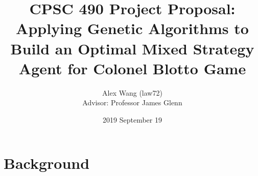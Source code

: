 \documentclass[11pt,letter]{article}
\begin{document}


\title{CPSC 490 Project Proposal: \\
       Applying Genetic Algorithms to Build an Optimal Mixed Strategy Agent for Colonel Blotto Game}

\author{Alex Wang (law72)\\
   		Advisor: Professor James Glenn}

\date{2019 September 19}
 
\maketitle 
\newtheorem{lemma}[theorem]{Lemma}
\newtheorem{prop}{Proposition}

\newcommand{\R}{\mathbb{R}}
\newcommand{\Z}{\mathbb{Z}}
\newcommand{\N}{\mathbb{N}}
\newcommand{\C}{\mathbb{C}}
\newcommand{\Q}{\mathbb{Q}}
\newcommand{\F}{\mathbb{F}}
\newcommand{\K}{\mathcal{K}}
\newcommand{\IdTwo}{\begin{pmatrix} 1 & 0\\0 & 1 \end{pmatrix}}
\newcommand{\abs}[1]{\left| #1 \right|}

\newcommand{\twodiagmat}[2]{\begin{pmatrix} #1 & 0\\0 & #2 \end{pmatrix}}
\newcommand{\pf}{\vskip 5pt \noindent \textit{Proof. }}
\newcommand{\sol}{\vskip 5pt \noindent \textit{Solution. }}

\newcommand{\pfi}{\vskip 5pt \noindent \textit{Proof by induction. }}
\renewcommand{\qed}{\hfill $\square$}
\newcommand{\assoc}{\text{ [associativity]}}
\newcommand{\aut}{\text{Aut}}
\newcommand{\inn}{\text{Inn}}
\newcommand\barbelow[1]{\stackunder[1.2pt]{$#1$}{\rule{.8ex}{.075ex}}}

\newcommand{\glv}{\text{GL}(V)}
\newcommand{\gln}{\text{GL}_n(\F_p)}
\newcommand{\Mod}[1]{\ (\mathrm{mod}\ #1)}
\newcommand{\Var}[1]{\mathrm{Var}(#1)}
\newcommand{\w}[1]{\overline{#1}}
\newcommand{\eet}{e^{i\theta}}
\newcommand{\eent}{e^{-i\theta}}
\newcommand{\eit}{e^{it}}
\newcommand{\enit}{e^{-it}}

\newcommand{\interior}[1]{%
  {\kern0pt#1}^{\mathrm{o}}%
}

\section{Background} %
\end{document}
